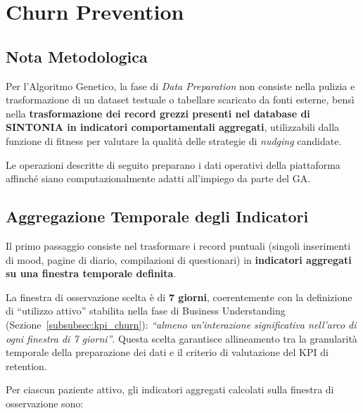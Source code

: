 \section{Churn Prevention}
\label{sec:prep_churn}

\subsection{Nota Metodologica}

Per l'Algoritmo Genetico, la fase di \textit{Data Preparation} non consiste nella pulizia e trasformazione di un dataset testuale o tabellare scaricato da fonti esterne, bensì nella \textbf{trasformazione dei record grezzi presenti nel database di SINTONIA in indicatori comportamentali aggregati}, utilizzabili dalla funzione di fitness per valutare la qualità delle strategie di \textit{nudging} candidate.

Le operazioni descritte di seguito preparano i dati operativi della piattaforma affinché siano computazionalmente adatti all'impiego da parte del GA.

\subsection{Aggregazione Temporale degli Indicatori}
\label{subsec:aggregazione_temporale}

Il primo passaggio consiste nel trasformare i record puntuali (singoli inserimenti di mood, pagine di diario, compilazioni di questionari) in \textbf{indicatori aggregati su una finestra temporale definita}.

La finestra di osservazione scelta è di \textbf{7 giorni}, coerentemente con la definizione di ``utilizzo attivo'' stabilita nella fase di Business Understanding (Sezione~\ref{subsubsec:kpi_churn}): \textit{``almeno un'interazione significativa nell'arco di ogni finestra di 7 giorni''}. Questa scelta garantisce allineamento tra la granularità temporale della preparazione dei dati e il criterio di valutazione del KPI di retention.

Per ciascun paziente attivo, gli indicatori aggregati calcolati sulla finestra di osservazione sono:

